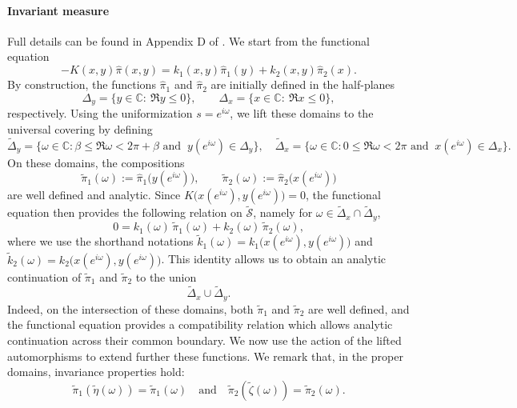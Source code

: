 \documentclass[11pt]{article}
\theoremstyle{definition}
\begin{document}
\paragraph{Invariant measure}
Full details can be found in Appendix D of \cite{franceschi_bousquet_melou_price_hardouin_raschel_stationary_2023}.
We start from the functional equation
\[
-K(x,y)\widehat{\pi}(x,y)
=
k_1(x,y)\widehat{\pi}_1(y)
+
k_2(x,y)\widehat{\pi}_2(x).
\]
By construction, the functions $\widehat{\pi}_1$ and $\widehat{\pi}_2$ are initially defined in the half-planes
\[
\Delta_y=\{y\in\mathbb{C}:\ \Re y\leqslant 0\},
\qquad
\Delta_x=\{x\in\mathbb{C}:\ \Re x\leqslant0\},
\]
respectively. Using the uniformization $s=e^{i\omega}$, we lift these domains to the universal covering by defining
\[
\widetilde{\Delta}_y=\{\omega\in\mathbb{C}:\beta\leqslant \Re\omega<2\pi+\beta\text{ and }\ y(e^{i\omega})\in\Delta_y\},
\quad
\widetilde{\Delta}_x=\{\omega\in\mathbb{C}:0\leqslant \Re \omega<2\pi\text{ and }\ x(e^{i\omega})\in\Delta_x\}.
\]
On these domains, the compositions
\[
\widetilde{\pi}_1(\omega):=\widehat{\pi}_1\bigl(y(e^{i\omega})\bigr),
\qquad
\widetilde{\pi}_2(\omega):=\widehat{\pi}_2\bigl(x(e^{i\omega})\bigr)
\]
are well defined and analytic. 
Since $K\bigl(x(e^{i\omega}),y(e^{i\omega})\bigr)=0$, the functional equation then provides the following relation on $ \widetilde{\mathcal S}$, namely for $\omega\in\widetilde{\Delta}_x\cap\widetilde{\Delta}_y $, 
\begin{equation}
0
=
k_1(\omega)\,
\widetilde{\pi}_1(\omega)
+
k_2(\omega)\,
\widetilde{\pi}_2(\omega),
\label{fe:revetement}
\end{equation}
where we use the shorthand notations $\widetilde k_1(\omega)=k_1\bigl(x(e^{i\omega}),y(e^{i\omega})\bigr)$ and $\widetilde k_2(\omega)=k_2\bigl(x(e^{i\omega}),y(e^{i\omega})\bigr)$. This identity allows us to obtain an analytic continuation of $\widetilde{\pi}_1$ and $\widetilde{\pi}_2$ to the union
\[
\widetilde{\Delta}_x \cup \widetilde{\Delta}_y.
\]
Indeed, on the intersection of these domains, both $\widetilde{\pi}_1$ and $\widetilde{\pi}_2$ are well defined, and the functional equation provides a compatibility relation which allows analytic continuation across their common boundary.
We now use the action of the lifted automorphisms to extend further these functions.
We remark that, in the proper domains, invariance properties hold:
\begin{equation}
\widetilde{\pi}_1(\widetilde{\eta}(\omega))=\widetilde{\pi}_1(\omega)
\quad\text{and}\quad
\widetilde{\pi}_2(\widetilde{\zeta}(\omega))=\widetilde{\pi}_2(\omega)
.
\label{inv:relevement}
\end{equation}
\end{document}
